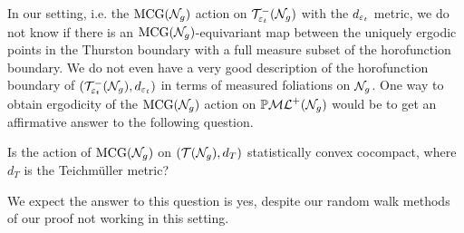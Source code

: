 \begin{remark}
  In our setting, i.e. the $\mathrm{MCG}(\mathcal{N}_g)$ action on $\mathcal{T}_{\varepsilon_t}^{-}(\mathcal{N}_g)$ with the $d_{\varepsilon_t}$ metric, we do not know if there is an $\mathrm{MCG}(\mathcal{N}_g)$-equivariant map between the uniquely ergodic points in the Thurston boundary with a full measure subset of the horofunction boundary.
  We do not even have a very good description of the horofunction boundary of $(\mathcal{T}_{\varepsilon_t}^{-}(\mathcal{N}_g), d_{\varepsilon_t})$ in terms of measured foliations on $\mathcal{N}_g$.
  One way to obtain ergodicity of the $\mathrm{MCG}(\mathcal{N}_g)$ action on $\mathbb{P}\mathcal{ML}^+(\mathcal{N}_g)$ would be to get an affirmative answer to the following question.
\begin{question}
  \label{ques:full-scc}
  Is the action of $\mathrm{MCG}(\mathcal{N}_g)$ on $(\mathcal{T}(\mathcal{N}_g), d_T)$ statistically convex cocompact, where $d_T$ is the Teichmüller metric?
\end{question}
We expect the answer to this question is yes, despite our random walk methods of our proof not working in this setting.
\end{remark}







